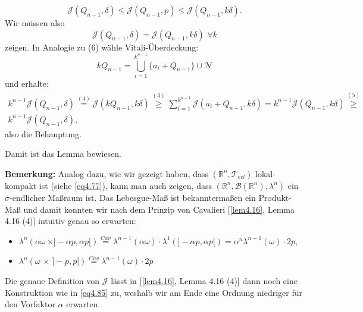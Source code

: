 \begin{itemize}
\begin{equation}
        \mathcal{J}(Q_{n-1},\delta) \leq \mathcal{J}(Q_{n-1},p) \leq \mathcal{J}(Q_{n-1},k \delta).
    \end{equation}
    Wir müssen also
    \begin{equation}
        \mathcal{J}(Q_{n-1},\delta) = \mathcal{J}(Q_{n-1},k \delta) \, \, \forall k
    \end{equation}
    zeigen. In Analogie zu (6) wähle Vitali-Überdeckung:
    \begin{equation}
        kQ_{n-1} = \bigcup_{i=1}^{k^{n-1}} \{a_i + Q_{n-1}\} \cup \mathcal{N}
    \end{equation}
    und erhalte:
    \begin{equation}
    \begin{array}{l}
        k^{n-1} \mathcal{J}(Q_{n-1},\delta) \stackrel{(4)}{=} \mathcal{J}(kQ_{n-1},k \delta) \stackrel{(3)}{\geq} \sum_{i=1}^{k^{n-1}} \mathcal{J}(a_i + Q_{n-1},k \delta) = k^{n-1} \mathcal{J}(Q_{n-1},k \delta) \stackrel{(5)}{\geq} \\
        k^{n-1} \mathcal{J}(Q_{n-1},\delta),
    \end{array}
    \end{equation}
    also die Behauptung.
\end{itemize}
Damit ist das Lemma bewiesen. \QEDB

\textbf{Bemerkung:} Analog dazu, wie wir gezeigt haben, dass \((\mathbb{R}^n,\mathcal{T}_{ecl})\) lokal-kompakt ist (siehe \eqref{eq4.77}), kann man auch zeigen, dass \((\mathbb{R}^n,\mathcal{B}(\mathbb{R}^n),\lambda^n)\) ein \(\sigma\)-endlicher Maßraum ist. Das Lebesgue-Maß ist bekanntermaßen ein Produkt-Maß und damit konnten wir nach dem Prinzip von Cavalieri [\ref{lem4.16}, Lemma 4.16 (4)] intuitiv genau so erwarten:
\begin{itemize}
    \item \(\lambda^n(\alpha \omega \, \times ]-\alpha p,\alpha p[) \stackrel{Cav}{=} \lambda^{n-1}(\alpha \omega) \cdot \lambda^1(]-\alpha p,\alpha p[) = \alpha^{n} \lambda^{n-1}(\omega) \cdot 2p\),
    \item \(\lambda^n(\omega \, \times \, ]-p,p[) \stackrel{Cav}{=} \lambda^{n-1}(\omega) \cdot 2p\)
\end{itemize}
Die genaue Definition von \(\mathcal{J}\) lässt in [\ref{lem4.16}, Lemma 4.16 (4)] dann noch eine Konstruktion wie in \eqref{eq4.85} zu, weshalb wir am Ende eine Ordnung niedriger für den Vorfaktor \(\alpha\) erwarten.\\


